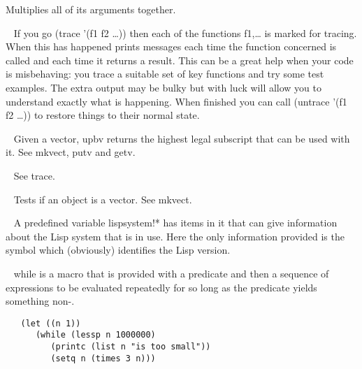 \begin{description}
Multiplies all of its arguments together.
\item[{\tx trace~~~~~~~~} \hspace{1cm} {\em function 1 arg}]~\newline
If you go {\tx (trace '(f1 f2 \ldots))} then each of the functions {\tx f1},\ldots
is marked for tracing. When this has happened \vsl{} prints messages each time
the function concerned is called and each time it returns a result. This
can be a great help when your code is misbehaving: you {\tx trace} a suitable
set of key functions and try some test examples. The extra output may be
bulky but with luck will allow you to understand exactly what is happening.
When finished you can call {\tx (untrace '(f1 f2 \ldots))} to restore
things to their normal state. 
\item[{\tx upbv~~~~~~~~~} \hspace{1cm} {\em function 1 arg}]~\newline
Given a vector, {\tx upbv} returns the highest legal subscript that can be
used with it. See {\tx mkvect}, {\tx putv} and {\tx getv}.
\item[{\tx untrace~~~~~~} \hspace{1cm} {\em function 1 arg}]~\newline
See {\tx trace}.
\item[{\tx vectorp~~~~~~} \hspace{1cm} {\em function 1 arg}]~\newline
Tests if an object is a vector. See {\tx mkvect}.
\item[{\tx vsl~~~~~~~~~~} \hspace{1cm} {\em symbol in lispsystem!*}]~\newline
A predefined variable {\tx lispsystem!*} has items in it that
can give information about the Lisp system that is in use. Here the only
information provided is the symbol \vsl{} which (obviously) identifies the
Lisp version.
\item[{\tx while~~~~~~~~} \hspace{1cm} {\em macro}]~\newline
{\tx while} is a macro that is provided with a predicate and then a sequence
of expressions to be evaluated repeatedly for so long as the predicate yields
something non-\nil.
{\small\begin{verbatim}
   (let ((n 1))
      (while (lessp n 1000000)
         (printc (list n "is too small"))
         (setq n (times 3 n)))

\end{verbatim}}
\end{description}
